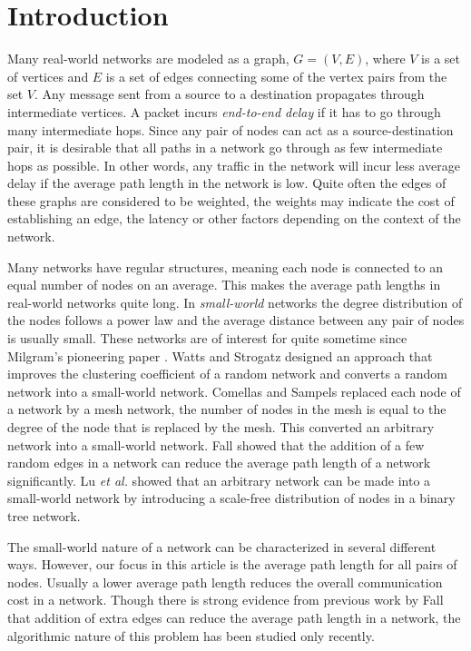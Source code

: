 \documentclass[10pt,letterpaper]{article}
\begin{document}
\section*{Introduction}
Many real-world networks are modeled as a graph, $G=(V,E)$, where $V$ is a set of vertices  
and $E$ is a set of edges connecting some of the vertex pairs from the set $V$. Any message sent 
from a source to a destination propagates through intermediate vertices.  
A packet incurs {\em end-to-end delay} if it has to go through many 
intermediate hops. Since any pair of nodes can act as a source-destination pair, it is desirable 
that all paths in a network go through as few intermediate hops as possible. In other words, 
any traffic in the network will incur less average delay if the average path length 
in the network is low. Quite often the edges of these graphs are considered to be weighted, 
the weights may indicate the cost of establishing an edge, the latency or other factors 
depending on the context of the network.  

Many networks have regular structures, meaning each node is connected to an equal number 
of nodes on an average. This makes the average path lengths in real-world networks quite long. 
In {\em small-world} networks the degree distribution of the nodes follows a power law 
and the average distance between any pair of nodes is usually small. These networks are of  
interest for quite sometime since Milgram's pioneering paper \cite{M}. Watts and Strogatz \cite{WS}
designed an approach that improves the clustering coefficient of a random network and converts 
a random network into a small-world network. Comellas and Sampels \cite{CS} replaced each node of a 
network by a mesh network, the number of nodes in the mesh is equal to the 
degree of the node that is replaced
by the mesh. This converted an arbitrary network into a small-world network. Fall \cite{F} showed that 
the addition of a few random edges in a network can reduce the average path length of a network 
significantly. Lu {\em et al.} \cite{LSG} showed that an arbitrary network can be made into a 
small-world network by introducing a scale-free distribution of nodes in a binary tree network.
 

The small-world nature of a network can be characterized in several different ways. 
However, our focus in this article is the average path length for all pairs of nodes.  
Usually a lower average 
path length reduces the overall communication cost in a network. 
Though there is strong evidence from previous work by Fall ~\cite{F} that addition of extra 
edges can reduce the average path length in a network, the algorithmic nature of this problem 
has been studied only recently. 
\end{document}
